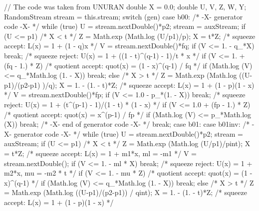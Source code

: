 \begin{code}
\begin{hide}
{      // The code was taken from UNURAN
      double X = 0.0;
      double U, V, Z, W, Y;
      RandomStream stream = this.stream;
      switch (gen) {
      case b00:
         /* -X- generator code -X- */
         while (true) {
           U = stream.nextDouble()*p2;
           stream = auxStream;
            if (U <= p1) {                  /*  X < t       */
               Z = Math.exp (Math.log (U/p1)/p);
               X = t*Z;
               /* squeeze accept:   L(x) = 1 + (1 - q)x   */
               V = stream.nextDouble()*fq;
               if (V <= 1. - q_*X)
                  break;
               /* squeeze reject:   U(x) = 1 + ((1 - t)^(q-1) - 1)/t * x  */
               if (V <= 1. + (fq - 1.) * Z) {
                  /* quotient accept:  quot(x) = (1 - x)^(q-1) / fq       */
                  if (Math.log (V) <= q_*Math.log (1. - X))
                     break;
               }
            }
            else {          /*  X > t  */
               Z = Math.exp (Math.log ((U-p1)/(p2-p1) )/q);
               X = 1. - (1. - t)*Z;
               /* squeeze accept:   L(x) = 1 + (1 - p)(1 - x)            */
               V = stream.nextDouble()*fp;
               if (V <= 1.0 - p_*(1. - X))
                  break;
               /* squeeze reject: U(x) = 1 + (t^(p-1) - 1)/(1 - t) * (1 - x) */
               if (V <= 1.0 + (fp - 1.) * Z) {
                  /* quotient accept:  quot(x) = x^(p-1) / fp             */
                  if (Math.log (V) <= p_*Math.log (X))  
                     break;
               }
            }
         }
         /* -X- end of generator code -X- */
         break;
      case b01:
      case b01inv:
         /* -X- generator code -X- */
         while (true) {
           U = stream.nextDouble()*p2;
           stream = auxStream;
            if (U <= p1) {    /*  X < t                                 */
               Z = Math.exp (Math.log (U/p1)/pint);
               X = t*Z;
               /* squeeze accept:   L(x) = 1 + m1*x,  ml = -m1          */
               V = stream.nextDouble();
               if (V <= 1. - ml * X)
                  break;
               /* squeeze reject:   U(x) = 1 + m2*x,  mu = -m2 * t      */
               if (V <= 1. - mu * Z)
                  /* quotient accept:  quot(x) = (1 - x)^(q-1)          */
                 if (Math.log (V) <= q_*Math.log (1. - X))
                     break;
            }
            else {             /*  X > t                                */
               Z = Math.exp (Math.log ((U-p1)/(p2-p1)) / qint);
               X = 1. - (1. - t)*Z;
               /* squeeze accept:   L(x) = 1 + (1 - p)(1 - x)            */
}}}}
\end{hide}
\end{code}
